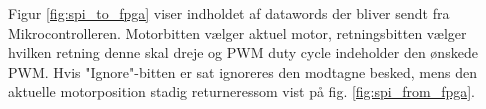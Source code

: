 Figur \ref{fig:spi_to_fpga} viser indholdet af datawords der bliver sendt fra Mikrocontrolleren. 
Motorbitten vælger aktuel motor, retningsbitten vælger hvilken retning
denne skal dreje og PWM duty cycle indeholder den ønskede PWM. 
Hvis "Ignore"-bitten er sat ignoreres den modtagne besked, mens den aktuelle motorposition stadig returneressom vist på fig.  \ref{fig:spi_from_fpga}. 

